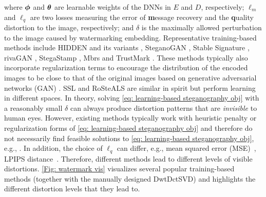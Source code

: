 where $\boldsymbol \phi$ and $\boldsymbol \theta$ are learnable weights of the DNNs in $E$ and $D$, respectively; $\ell_m$ and $\ell_q$ are two losses measuring the error of \textbf{m}essage recovery and the \textbf{q}uality distortion to the image, respectively; and $\delta$ is the maximally allowed perturbation to the image caused by watermarking embedding. Representative training-based methods include HIDDEN and its variants \citep{zhu2018hidden,wen2019romark,luo2020distortion}, SteganoGAN \citep{zhang2019steganogan}, Stable Signature \citep{fernandez2023stable}, rivaGAN \citep{zhang2019robust}, StegaStamp \citep{tancik2020stegastamp}, Mbrs \citep{jia2021mbrs} and TrustMark \citep{bui2023trustmark}. These methods typically also incorporate regularization terms to encourage the distribution of the encoded images to be close to that of the original images based on generative adversarial networks (GAN) \citep{goodfellow2014generative}. SSL \citep{fernandez2022watermarking} and RoSteALS \citep{bui2023rosteals} are similar in spirit but perform learning in different spaces. In theory, solving \cref{eq: learning-based steganography obj} with a reasonably small $\delta$ can always produce distortion patterns that are \emph{invisible} to human eyes. However, existing methods typically work with heuristic penalty or regularization forms of \cref{eq: learning-based steganography obj} and therefore do not necessarily find feasible solutions to \cref{eq: learning-based steganography obj}, e.g., \citep{zhu2018hidden}. In addition, the choice of $\ell_q$ can differ, e.g., mean squared error (MSE)~\citep{zhu2018hidden,zhang2019steganogan}, LPIPS distance~\citep{zhang2018unreasonable}. Therefore, different methods lead to different levels of visible distortions. \cref{Fig: watermark vis} visualizes several popular training-based methods (together with the manually designed DwtDctSVD) and highlights the different distortion levels that they lead to.


